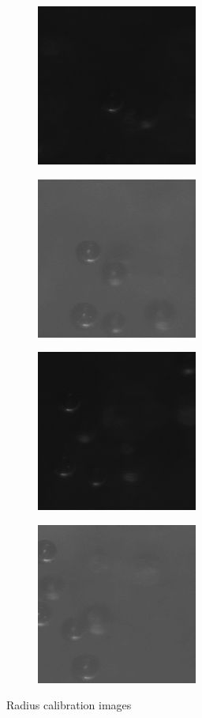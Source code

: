 			\begin{figure}
				\begin{subfigure}[b]{.55\textwidth}
					\centering
					\includegraphics[scale=1]{images/rad_calib_1.png}
					\caption{}
				\end{subfigure}
				\begin{subfigure}[b]{.55\textwidth}
					\centering
					\includegraphics[scale=1]{images/rad_calib_2.jpg}
					\caption{}
				\end{subfigure}
				\begin{subfigure}[b]{.55\textwidth}
					\centering
					\includegraphics[scale=1]{images/rad_calib_3.png}
					\caption{}
				\end{subfigure}
				\begin{subfigure}[b]{.55\textwidth}
					\centering
					\includegraphics[scale=1]{images/rad_calib_4.jpg}
					\caption{}
				\end{subfigure}
				
				\caption{Radius calibration images}
				\label{fig:radius_calibration_setup_result}
			\end{figure}
